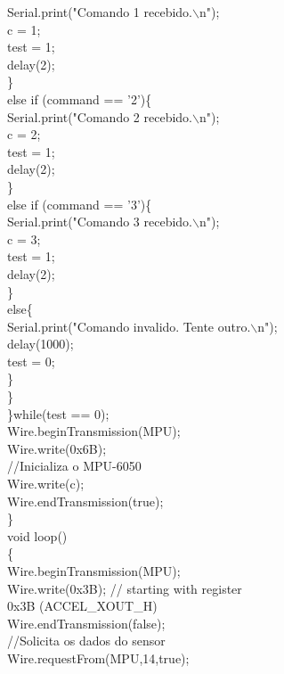 \begin{apendicesenv}
Serial.print("Comando 1 recebido.$\backslash$n");\\    
c = 1;\\
test = 1;\\
delay(2); \\
\}\\
else if (command == '2')\{\\
Serial.print("Comando 2 recebido.$\backslash$n");\\    
c = 2;\\
test = 1;\\
delay(2);\\
\}\\
else if (command == '3')\{\\
Serial.print("Comando 3 recebido.$\backslash$n");\\   
c = 3;\\
test = 1;\\
delay(2);\\
\}\\
else\{\\
Serial.print("Comando invalido. Tente outro.$\backslash$n");\\ 
delay(1000);\\
test = 0;\\
\}\\
\}\\
\}while(test == 0);\\
Wire.beginTransmission(MPU);\\
Wire.write(0x6B); \\

//Inicializa o MPU-6050\\
Wire.write(c); \\
Wire.endTransmission(true);\\
\}\\
void loop()\\
\{ \\

Wire.beginTransmission(MPU);\\
Wire.write(0x3B);  // starting with register\\ 0x3B (ACCEL\_XOUT\_H)\\
Wire.endTransmission(false);\\

//Solicita os dados do sensor\\
Wire.requestFrom(MPU,14,true); \\ 


\end{apendicesenv}
